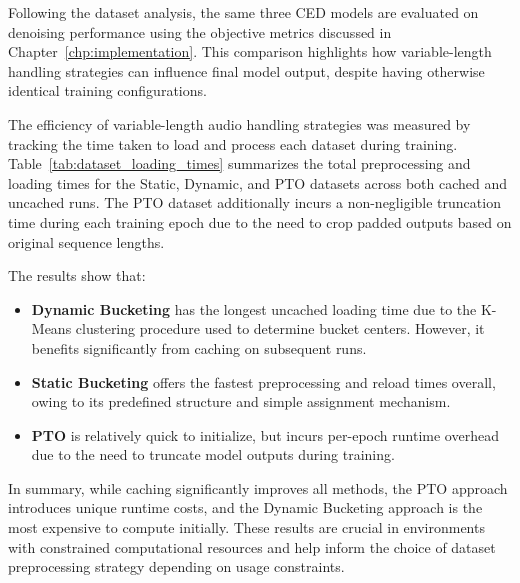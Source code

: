 


Following the dataset analysis, the same three CED models are evaluated on denoising performance using the objective metrics discussed in Chapter~\ref{chp:implementation}. This comparison highlights how variable-length handling strategies can influence final model output, despite having otherwise identical training configurations.


The efficiency of variable-length audio handling strategies was measured by tracking the time taken to load and process each dataset during training. Table~\ref{tab:dataset_loading_times} summarizes the total preprocessing and loading times for the Static, Dynamic, and PTO datasets across both cached and uncached runs. The PTO dataset additionally incurs a non-negligible truncation time during each training epoch due to the need to crop padded outputs based on original sequence lengths.



The results show that:
\begin{itemize}
    \item \textbf{Dynamic Bucketing} has the longest uncached loading time due to the K-Means clustering procedure used to determine bucket centers. However, it benefits significantly from caching on subsequent runs.
    \item \textbf{Static Bucketing} offers the fastest preprocessing and reload times overall, owing to its predefined structure and simple assignment mechanism.
    \item \textbf{PTO} is relatively quick to initialize, but incurs per-epoch runtime overhead due to the need to truncate model outputs during training.
\end{itemize}

In summary, while caching significantly improves all methods, the PTO approach introduces unique runtime costs, and the Dynamic Bucketing approach is the most expensive to compute initially. These results are crucial in environments with constrained computational resources and help inform the choice of dataset preprocessing strategy depending on usage constraints.
